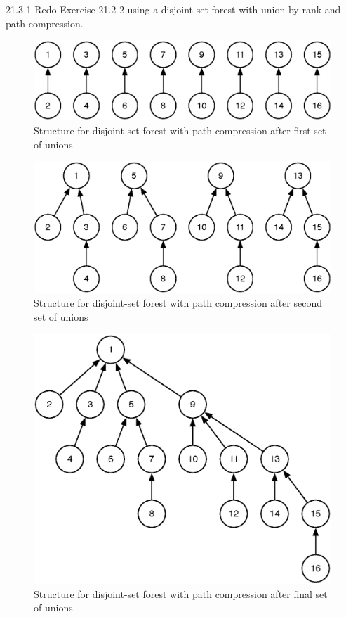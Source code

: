 

\usepackage{graphicx}
\usepackage{listings}




\homeworkheader{\classnameandsection}

\begin{problem}{21.3-1}
  Redo Exercise 21.2-2 using a disjoint-set forest with union by rank and path compression.
  \begin{solution}
    \begin{figure}[H]
      \centering
      \caption{Structure for disjoint-set forest with path compression after first set of unions}
      \includegraphics[scale=.5]{21_3_1_1.eps}
    \end{figure}
    \begin{figure}[H]
      \centering
      \caption{Structure for disjoint-set forest with path compression after second set of unions}
      \includegraphics[scale=.5]{21_3_1_2.eps}
    \end{figure}
    \begin{figure}[H]
      \centering
      \caption{Structure for disjoint-set forest with path compression after final set of unions}
      \includegraphics[scale=.5]{21_3_1_3.eps}

\end{figure}
\end{solution}
\end{problem}
